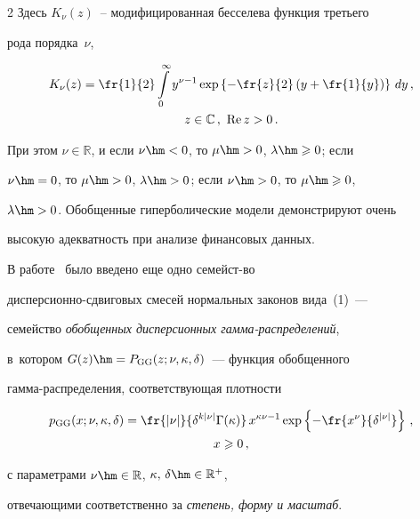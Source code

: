 \begin{multicols}{2}
Здесь $K_{\nu}(z)$~-- модифицированная бесселева функция третьего


рода порядка~$\nu$,


\begin{multline*}


K_{\nu}(z)=\fr{1}{2}\int\limits_{0}^{\infty}


y^{\nu-1}\exp\left\{-\fr{z}{2}\left(y+\fr{1}{y}\right)\right\}\,dy\,,\\


z\in\mathbb{C}\,,\ \mathrm{Re}\,z>0\,.


\end{multline*}


При этом $\nu\in\mathbb{R}$, и если $\nu\hm<0$, то $\mu\hm>0$, $\lambda\hm\geqslant0$; если


$\nu\hm=0$, то $\mu\hm>0$, $\lambda\hm>0$; если $\nu\hm>0$, то $\mu\hm\geqslant0$,


$\lambda\hm>0$. Обобщенные гиперболические модели демонстрируют очень


высокую адекватность при анализе финансовых данных.





В работе~\cite{KorolevSokolov2012} было введено еще одно семейст-\linebreak во


дис\-пер\-си\-он\-но-сдви\-го\-вых смесей нормальных \mbox{законов} вида~(1)~---


семейство {\it обобщенных дис\-пер\-си\-он\-ных гам\-ма-рас\-пре\-де\-ле\-ний}, 


в~котором $G(z)\hm=P_{\mathrm{GG}}(z;\nu,\kappa,\delta)$~--- функция обобщенного


гам\-ма-рас\-пре\-де\-ле\-ния, соответствующая плот\-ности


\begin{multline}


p_{\mathrm{GG}}(x;\nu,\kappa,\delta)=\fr{|\nu|}{\delta^{k|\nu|}\Gamma(\kappa)}\,


x^{\kappa\nu-1}\exp\left\{-\fr{x^{\nu}}{\delta^{|\nu|}}\right\}\,,\\


 x\geqslant0\,,


 \label{e2-kk}


\end{multline}


с параметрами $\nu\hm\in\mathbb{R}$,  $\kappa,\,\delta\hm\in{\mathbb R}^+$,


отвечающими соответственно за {\it степень, форму и масштаб}.



\end{multicols}
